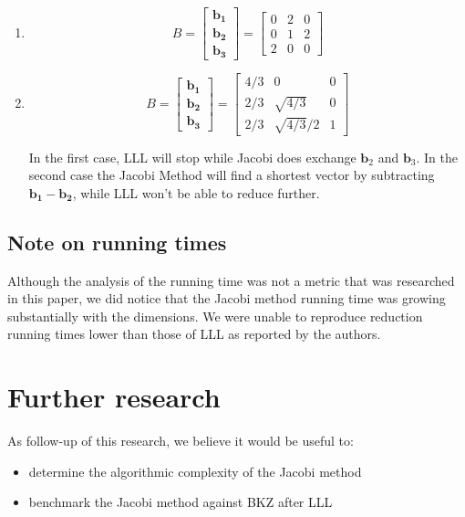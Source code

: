 \documentclass[10pt, a4paper]{article}
\renewcommand{\vec}[1]{\mathbf{#1}}
\begin{document}
\begin{enumerate}

\item \[
B = \begin{bmatrix}
  \vec{b_1} \\
  \vec{b_2} \\
  \vec{b_3}
 \end{bmatrix} = \begin{bmatrix}
  0 & 2 & 0 \\
  0 & 1 & 2 \\
  2 & 0 & 0
 \end{bmatrix}
\]


\item \[
B = \begin{bmatrix}
  \vec{b_1} \\
  \vec{b_2} \\
  \vec{b_3}
 \end{bmatrix} = \begin{bmatrix}
  4/3 & 0 & 0 \\
  2/3 & \sqrt{4/3} & 0 \\
  2/3 & \sqrt{4/3}/2 & 1
 \end{bmatrix}
\]

In the first case, LLL will stop while Jacobi does exchange $\vec{b}_2$ and $\vec{b}_3$. In the second case the Jacobi Method will find a shortest vector by subtracting $\vec{b_1}-\vec{b_2}$, while LLL won't be able to reduce further.
\end{enumerate}

\subsection{Note on running times}
Although the analysis of the running time was not a metric that was researched in this paper, we did notice that the Jacobi method running time was growing substantially with the dimensions. We were unable to reproduce reduction running times lower than those of LLL as reported by the authors.


\section{Further research}
As follow-up of this research, we believe it would be useful to:
\begin{itemize}
\item determine the algorithmic complexity of the Jacobi method
\item benchmark the Jacobi method against BKZ after LLL
\end{itemize}
\end{document}
